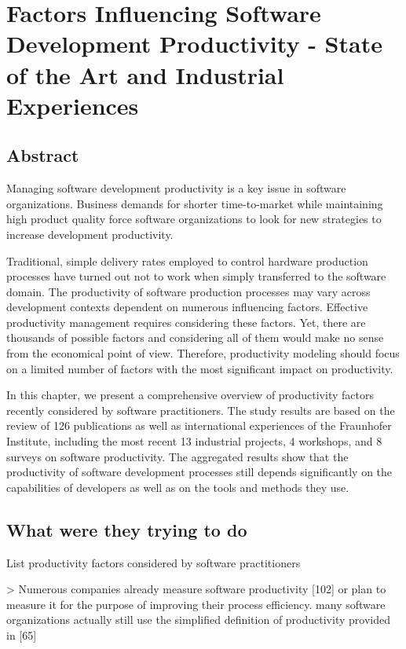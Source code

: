 \section{Factors Influencing Software Development Productivity - State of the Art and Industrial Experiences}

\subsection{Abstract}

Managing software development productivity is a key issue in software organizations. Business demands for shorter time-to-market while maintaining high product quality force software organizations to
look for new strategies to increase development productivity.

Traditional, simple delivery rates employed to control hardware production processes have turned out
not to work when simply transferred to the software domain. The productivity of software production
processes may vary across development contexts dependent on numerous influencing factors. Effective
productivity management requires considering these factors. Yet, there are thousands of possible factors
and considering all of them would make no sense from the economical point of view. Therefore, productivity modeling should focus on a limited number of factors with the most significant impact on productivity.

In this chapter, we present a comprehensive overview of productivity factors recently considered by
software practitioners. The study results are based on the review of 126 publications as well as international experiences of the Fraunhofer Institute, including the most recent 13 industrial projects, 4 workshops, and 8 surveys on software productivity. The aggregated results show that the productivity of
software development processes still depends significantly on the capabilities of developers as well as
on the tools and methods they use.

\subsection{What were they trying to do}

List productivity factors considered by software practitioners

> Numerous companies already measure software productivity [102] or plan to measure it for the purpose of improving their process efficiency. many software organizations actually still use the simplified definition of productivity
provided in [65]

